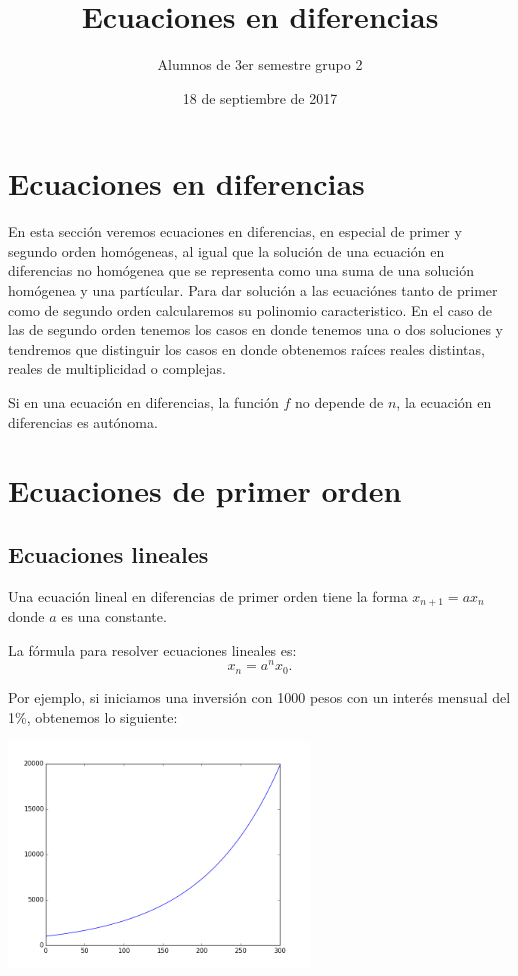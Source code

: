\documentclass{article}
\title{Ecuaciones en diferencias}
\author{Alumnos de 3er semestre grupo 2}
\date{18 de septiembre de 2017}
\begin{document}
\maketitle

\section{Ecuaciones en diferencias}
\label{sec:ecuaciones}

En esta sección veremos ecuaciones en diferencias, en especial de
primer y segundo orden homógeneas, al igual que la solución de una
ecuación en diferencias no homógenea que se representa como una suma
de una solución homógenea y una partícular.  Para dar solución a las
ecuaciónes tanto de primer como de segundo orden calcularemos su
polinomio caracteristico. En el caso de las de segundo orden tenemos
los casos en donde tenemos una o dos soluciones y tendremos que
distinguir los casos en donde obtenemos raíces reales distintas,
reales de multiplicidad o complejas.

Si en una ecuación en diferencias, la función $f$ no depende de $n$,
la ecuación en diferencias es autónoma.

\section{Ecuaciones de primer orden}

\subsection{Ecuaciones lineales}

Una ecuación lineal en diferencias de primer orden tiene la forma
$x_{n+1}=ax_n$ donde $a$ es una constante.

La fórmula para resolver ecuaciones lineales es:
\begin{equation}
  \label{lineal}
  x_n=a^nx_0.
\end{equation}

Por ejemplo, si iniciamos una inversión con 1000 pesos con un interés
mensual del 1\%, obtenemos lo siguiente:

\begin{center}
  \includegraphics[width=8cm]{inversion.png}
\end{center}
\end{document}
